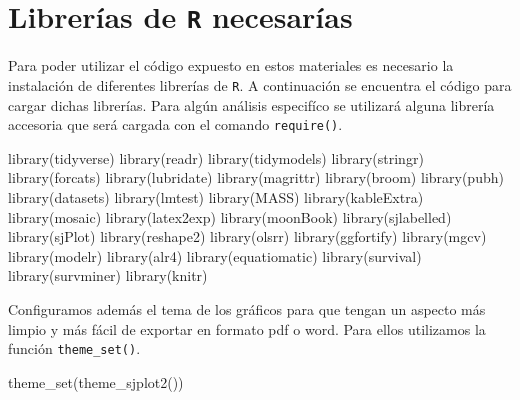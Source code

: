 \documentclass[
]{book}
\newenvironment{Shaded}{\begin{snugshade}}{\end{snugshade}}
\newcommand{\FunctionTok}[1]{\textcolor[rgb]{0.00,0.00,0.00}{#1}}
\newcommand{\NormalTok}[1]{#1}
\begin{document}
\hypertarget{libreruxedas-de-r-necesaruxedas}{%
\section{\texorpdfstring{Librerías de \texttt{R} necesarías}{Librerías de R necesarías}}\label{libreruxedas-de-r-necesaruxedas}}

Para poder utilizar el código expuesto en estos materiales es necesario la instalación de diferentes librerías de \texttt{R}. A continuación se encuentra el código para cargar dichas librerías. Para algún análisis especifíco se utilizará alguna librería accesoria que será cargada con el comando \texttt{require()}.

\begin{Shaded}
\begin{Highlighting}[]
\FunctionTok{library}\NormalTok{(tidyverse)}
\FunctionTok{library}\NormalTok{(readr)}
\FunctionTok{library}\NormalTok{(tidymodels)}
\FunctionTok{library}\NormalTok{(stringr)}
\FunctionTok{library}\NormalTok{(forcats)}
\FunctionTok{library}\NormalTok{(lubridate)}
\FunctionTok{library}\NormalTok{(magrittr)}
\FunctionTok{library}\NormalTok{(broom)}
\FunctionTok{library}\NormalTok{(pubh)}
\FunctionTok{library}\NormalTok{(datasets)}
\FunctionTok{library}\NormalTok{(lmtest)}
\FunctionTok{library}\NormalTok{(MASS)}
\FunctionTok{library}\NormalTok{(kableExtra)}
\FunctionTok{library}\NormalTok{(mosaic)}
\FunctionTok{library}\NormalTok{(latex2exp)}
\FunctionTok{library}\NormalTok{(moonBook)}
\FunctionTok{library}\NormalTok{(sjlabelled)}
\FunctionTok{library}\NormalTok{(sjPlot)}
\FunctionTok{library}\NormalTok{(reshape2)}
\FunctionTok{library}\NormalTok{(olsrr)}
\FunctionTok{library}\NormalTok{(ggfortify)}
\FunctionTok{library}\NormalTok{(mgcv)}
\FunctionTok{library}\NormalTok{(modelr)}
\FunctionTok{library}\NormalTok{(alr4)}
\FunctionTok{library}\NormalTok{(equatiomatic) }
\FunctionTok{library}\NormalTok{(survival)}
\FunctionTok{library}\NormalTok{(survminer)}
\FunctionTok{library}\NormalTok{(knitr)}
\end{Highlighting}
\end{Shaded}

Configuramos además el tema de los gráficos para que tengan un aspecto más limpio y más fácil de exportar en formato pdf o word. Para ellos utilizamos la función \texttt{theme\_set()}.

\begin{Shaded}
\begin{Highlighting}[]
\FunctionTok{theme\_set}\NormalTok{(}\FunctionTok{theme\_sjplot2}\NormalTok{())}
\end{Highlighting}
\end{Shaded}
\end{document}
